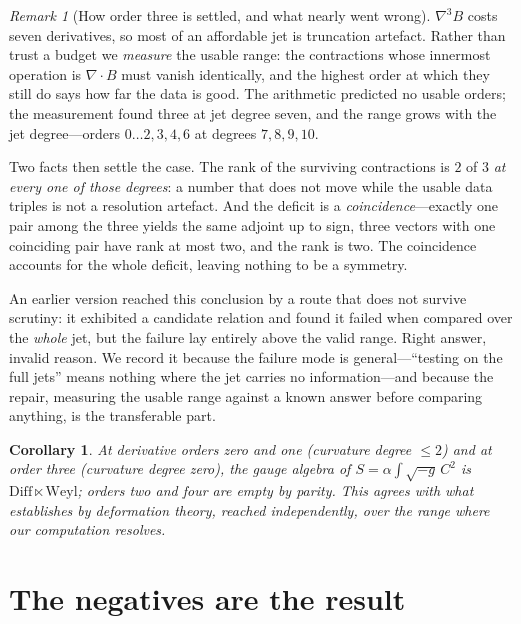 \documentclass[11pt]{article}
\newtheorem{corollary}[theorem]{Corollary}
\theoremstyle{definition}
\theoremstyle{remark}
\newtheorem{remark}[theorem]{Remark}
\begin{document}
\begin{remark}[How order three is settled, and what nearly went wrong]
\label{rem:truncation}
\(\nabla^{3}B\) costs seven derivatives, so most of an affordable jet is
truncation artefact.  Rather than trust a budget we \emph{measure} the usable
range: the contractions whose innermost operation is \(\nabla\!\cdot\!B\)
must vanish identically, and the highest order at which they still do says how
far the data is good.  The arithmetic predicted no usable orders; the
measurement found three at jet degree seven, and the range grows with the jet
degree---orders \(0\ldots2,3,4,6\) at degrees \(7,8,9,10\).

Two facts then settle the case.  The rank of the surviving contractions is
\(2\) of \(3\) \emph{at every one of those degrees}: a number that does not
move while the usable data triples is not a resolution artefact.  And the
deficit is a \emph{coincidence}---exactly one pair among the three yields the
same adjoint up to sign, three vectors with one coinciding pair have rank at
most two, and the rank is two.  The coincidence accounts for the whole
deficit, leaving nothing to be a symmetry.

An earlier version reached this conclusion by a route that does not survive
scrutiny: it exhibited a candidate relation and found it failed when compared
over the \emph{whole} jet, but the failure lay entirely above the valid range.
Right answer, invalid reason.  We record it because the failure mode is
general---``testing on the full jets'' means nothing where the jet carries no
information---and because the repair, measuring the usable range against a
known answer before comparing anything, is the transferable part.
\end{remark}

\begin{corollary}
At derivative orders zero and one (curvature degree \(\le2\)) and at order
three (curvature degree zero), the gauge algebra of
\(S=\alpha\int\!\sqrt{-g}\,C^{2}\) is
\(\mathrm{Diff}\ltimes\mathrm{Weyl}\); orders two and four are empty by
parity.  This agrees with what \cite{BoulangerHenneaux2001} establishes by
deformation theory, reached independently, over the range where our
computation resolves.
\end{corollary}

\section{The negatives are the result}
\label{sec:negatives}
\end{document}
